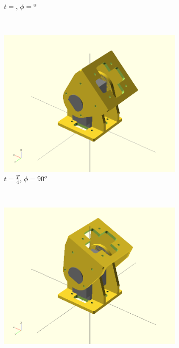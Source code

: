 \begin{figure}[h]
\begin{subfigure}[b]{0.18\textwidth}
                \caption{$t = $, $\phi=º$}
                \label{fig:Gait_osc_center_112_5}
        \end{subfigure}
        ~
        \begin{subfigure}[b]{0.18\textwidth}
         	   \centering
                \includegraphics[width=\textwidth]{images/Gait_osc_center_135.png}
                \caption{$t = \frac{T}{4}$, $\phi=90º$}
                \label{fig:Gait_osc_center_135}
        \end{subfigure}
        ~
        \begin{subfigure}[b]{0.18\textwidth}
         	   \centering
                \includegraphics[width=\textwidth]{images/Gait_osc_center_112_5.png}

\end{subfigure}
\end{figure}

